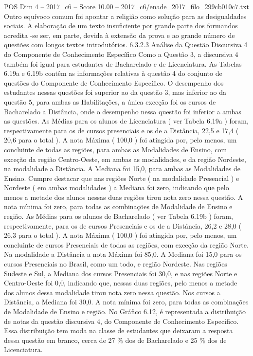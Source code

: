 \begin{textsample}{POS Dim 4 – 2017\_c6 – Score 10.00 – 2017\_c6/enade\_2017\_filo\_299cb010c7.txt}
Outro equívoco comum foi apontar a religião como solução para as desigualdades sociais.
A elaboração de um texto insuficiente por grande parte dos formandos acredita -se ser, em parte, devida à extensão da prova e ao grande número de questões com longos textos introdutórios. 6.3.2.3 Análise da Questão Discursiva 4 do Componente de Conhecimento Específico Como a Questão 3, a discursiva 4 também foi igual para estudantes de Bacharelado e de Licenciatura.
As Tabelas 6.19a e 6.19b contêm as informações relativas à questão 4 do conjunto de questões do Componente de Conhecimento Específico.
O desempenho dos estudantes nessas questões foi superior ao da questão 3, mas inferior ao da questão 5, para ambas as Habilitações, a única exceção foi os cursos de Bacharelado a Distância, onde o desempenho nessa questão foi inferior a ambas as questões.
As Médias para os alunos de Licenciatura ( ver Tabela 6.19a ) foram, respectivamente para os de cursos presenciais e os de a Distância, 22,5 e 17,4 ( 20,6 para o total ).
A nota Máxima ( 100,0 ) foi atingida por, pelo menos, um concluinte de todas as regiões, para ambas as Modalidades de Ensino, com exceção da região Centro-Oeste, em ambas as modalidades, e da região Nordeste, na modalidade a Distância.
A Mediana foi 15,0, para ambas as Modalidades de Ensino.
Cumpre destacar que nas regiões Norte ( na modalidade Presencial ) e Nordeste ( em ambas modalidades ) a Mediana foi zero, indicando que pelo menos a metade dos alunos nessas duas regiões tirou nota zero nessa questão.
A nota mínima foi zero, para todas as combinações de Modalidade de Ensino e região.
As Médias para os alunos de Bacharelado ( ver Tabela 6.19b ) foram, respectivamente, para os de cursos Presenciais e os de a Distância, 26,2 e 28,0 ( 26,3 para o total ).
A nota Máxima ( 100,0 ) foi atingida por, pelo menos, um concluinte de cursos Presenciais de todas as regiões, com exceção da região Norte.
Na modalidade a Distância a nota Máxima foi 85,0.
A Mediana foi 15,0 para os cursos Presenciais no Brasil, como um todo, e região Nordeste.
Nas regiões Sudeste e Sul, a Mediana dos cursos Presenciais foi 30,0, e nas regiões Norte e Centro-Oeste foi 0,0, indicando que, nessas duas regiões, pelo menos a metade dos alunos dessa modalidade tirou nota zero nessa questão.
Nos cursos a Distância, a Mediana foi 30,0.
A nota mínima foi zero, para todas as combinações de Modalidade de Ensino e região.
No Gráfico 6.12, é representada a distribuição de notas da questão discursiva 4, do Componente de Conhecimento Específico.
Essa distribuição tem moda na classe de estudantes que deixaram a resposta dessa questão em branco, cerca de 27 \% dos de Bacharelado e 25 \% dos de Licenciatura.

\end{textsample}
